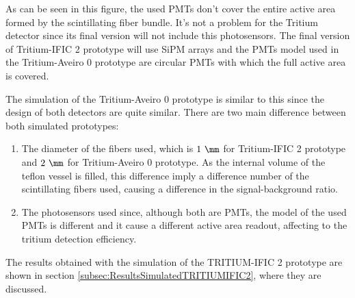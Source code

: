 As can be seen in this figure, the used PMTs don't cover the entire active area formed by the scintillating fiber bundle. It's not a problem for the Tritium detector since its final version will not include this photosensors. The final version of Tritium-IFIC 2 prototype will use SiPM arrays and the PMTs model used in the Tritium-Aveiro 0 prototype are circular PMTs with which the full active area is covered.

The simulation of the Tritium-Aveiro 0 prototype is similar to this since the design of both detectors are quite similar. There are two main difference between both simulated prototypes:

\begin{enumerate}

\item{} The diameter of the fibers used, which is $1~\mm$ for Tritium-IFIC 2 prototype and $2~\mm$ for Tritium-Aveiro 0 prototype. As the internal volume of the teflon vessel is filled, this difference imply a difference number of the scintillating fibers used, causing a difference in the signal-background ratio.

\item{} The photosensors used since, although both are PMTs, the model of the used PMTs is different and it cause a different active area readout, affecting to the tritium detection efficiency. 

\end{enumerate}

The results obtained with the simulation of the TRITIUM-IFIC 2 prototype are shown in section \ref{subsec:ResultsSimulatedTRITIUMIFIC2}, where they are discussed.